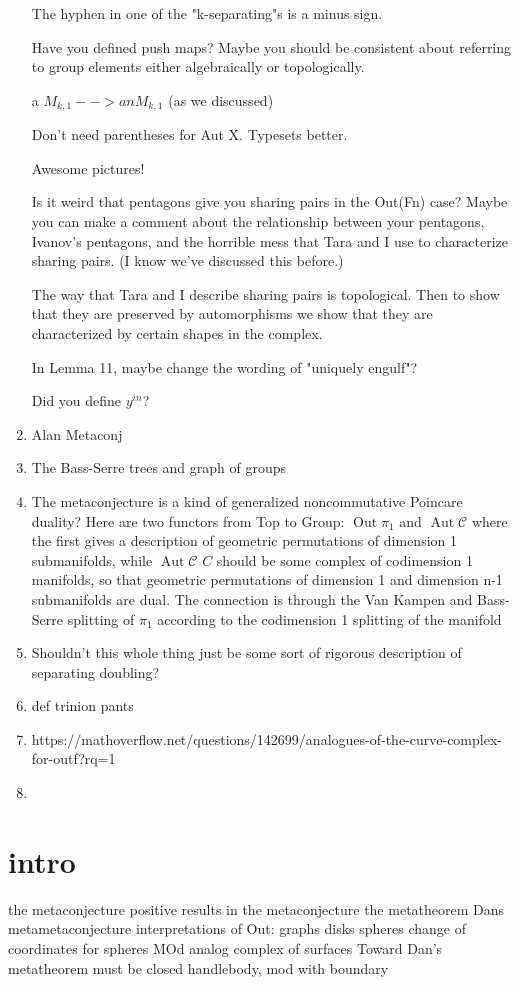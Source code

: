 \documentclass[11pt]{article}
\DeclareMathOperator{\oout}{Out}
\DeclareMathOperator{\aaut}{Aut}
\theoremstyle{remark}
\theoremstyle{definition}
\begin{document}
\begin{enumerate}
The hyphen in one of the "k-separating"s is a minus sign.

Have you defined push maps?  Maybe you should be consistent about
referring to group elements either algebraically or topologically.

a $M_{k,1} --> an M_{k,1}$ (as we discussed)

Don't need parentheses for Aut X.  Typesets better.

Awesome pictures!

Is it weird that pentagons give you sharing pairs in the Out(Fn) case?
Maybe you can make a comment about the relationship between your
pentagons, Ivanov's pentagons, and the horrible mess that Tara and I use
to characterize sharing pairs.  (I know we've discussed this before.)

The way that Tara and I describe sharing pairs is topological.  Then to
show that they are preserved by automorphisms we show that they are
characterized by certain shapes in the complex.

In Lemma 11, maybe change the wording of "uniquely engulf"?

Did you define $y^{in}$?

\item Alan Metaconj
\item The Bass-Serre trees and graph of groups
\item The metaconjecture is  a kind of
generalized noncommutative Poincare duality?
Here are two functors from Top to Group:
$\oout \pi_1$ and $\aaut  \mathcal C$
where the first gives a description of
geometric permutations of dimension 1
submanifolds, while
$\aaut  \mathcal C$
$C$ should be some complex of codimension 1 manifolds,
so that
 geometric permutations of dimension 1 and dimension n-1
submanifolds are dual.
The connection is through the Van Kampen and Bass-Serre
splitting of $\pi_1$ according to the codimension 1 splitting of the manifold

\item Shouldn't this whole thing just
be some sort of rigorous
description of separating doubling?
\item def trinion pants
\item https://mathoverflow.net/questions/142699/analogues-of-the-curve-complex-for-outf?rq=1
\item
\end{enumerate}

\section{intro}
the metaconjecture
positive results in the metaconjecture
the metatheorem
Dans metametaconjecture
interpretations of Out:
graphs disks spheres
change of coordinates for spheres
MOd analog
complex of surfaces
Toward Dan's metatheorem
must be closed
handlebody, mod with boundary
\end{document}
